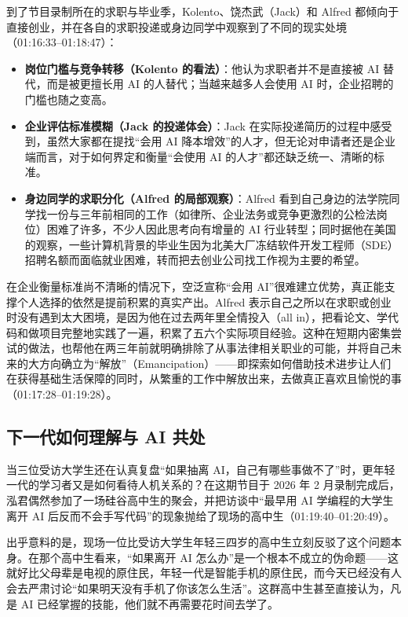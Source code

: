 \documentclass[UTF8,a4paper,11pt,fontset=fandol]{ctexart}
\begin{document}
到了节目录制所在的求职与毕业季，Kolento、饶杰武（Jack）和 Alfred 都倾向于直接创业，并在各自的求职投递或身边同学中观察到了不同的现实处境（01:16:33–01:18:47）：
\begin{itemize}
\item \textbf{岗位门槛与竞争转移（Kolento 的看法）}：他认为求职者并不是直接被 AI 替代，而是被更擅长用 AI 的人替代；当越来越多人会使用 AI 时，企业招聘的门槛也随之变高。
\item \textbf{企业评估标准模糊（Jack 的投递体会）}：Jack 在实际投递简历的过程中感受到，虽然大家都在提找“会用 AI 降本增效”的人才，但无论对申请者还是企业端而言，对于如何界定和衡量“会使用 AI 的人才”都还缺乏统一、清晰的标准。
\item \textbf{身边同学的求职分化（Alfred 的局部观察）}：Alfred 看到自己身边的法学院同学找一份与三年前相同的工作（如律所、企业法务或竞争更激烈的公检法岗位）困难了许多，不少人因此思考向有增量的 AI 行业转型；同时据他在美国的观察，一些计算机背景的毕业生因为北美大厂冻结软件开发工程师（SDE）招聘名额而面临就业困难，转而把去创业公司找工作视为主要的希望。
\end{itemize}

在企业衡量标准尚不清晰的情况下，空泛宣称“会用 AI”很难建立优势，真正能支撑个人选择的依然是提前积累的真实产出。Alfred 表示自己之所以在求职或创业时没有遇到太大困境，是因为他在过去两年里全情投入（all in），把看论文、学代码和做项目完整地实践了一遍，积累了五六个实际项目经验。这种在短期内密集尝试的做法，也帮他在两三年前就明确排除了从事法律相关职业的可能，并将自己未来的大方向确立为“解放”（Emancipation）——即探索如何借助技术进步让人们在获得基础生活保障的同时，从繁重的工作中解放出来，去做真正喜欢且愉悦的事（01:17:28–01:19:28）。

\subsection{下一代如何理解与 AI 共处}
当三位受访大学生还在认真复盘“如果抽离 AI，自己有哪些事做不了”时，更年轻一代的学习者又是如何看待人机关系的？在这期节目于 2026 年 2 月录制完成后，泓君偶然参加了一场硅谷高中生的聚会，并把访谈中“最早用 AI 学编程的大学生离开 AI 后反而不会手写代码”的现象抛给了现场的高中生（01:19:40–01:20:49）。

出乎意料的是，现场一位比受访大学生年轻三四岁的高中生立刻反驳了这个问题本身。在那个高中生看来，“如果离开 AI 怎么办”是一个根本不成立的伪命题——这就好比父母辈是电视的原住民，年轻一代是智能手机的原住民，而今天已经没有人会去严肃讨论“如果明天没有手机了你该怎么生活”。这群高中生甚至直接认为，凡是 AI 已经掌握的技能，他们就不再需要花时间去学了。
\end{document}
